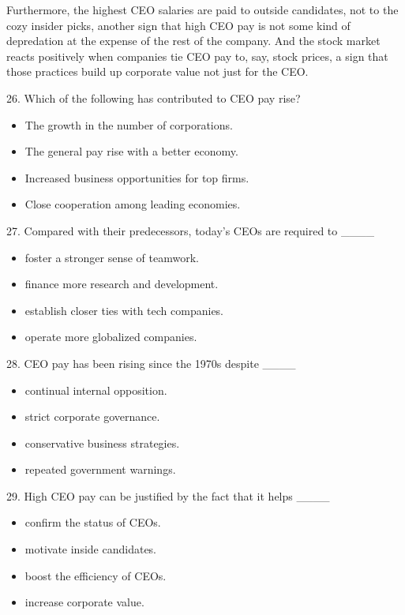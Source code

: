 \documentclass[UTF8,11pt]{ctexart}
\begin{document}
Furthermore, the highest CEO salaries are paid to outside candidates, not to the cozy insider picks, another sign that high CEO pay is not some kind of depredation at the expense of the rest of the company. And the stock market reacts positively when companies tie CEO pay to, say, stock prices, a sign that those practices build up corporate value not just for the CEO.


26. Which of the following has contributed to CEO pay rise?


\begin{itemize}[leftmargin=2em,itemsep=.2em,topsep=.4em]\item[A.] The growth in the number of corporations.
\item[B.] The general pay rise with a better economy.
\item[C.] Increased business opportunities for top firms.
\item[D.] Close cooperation among leading economies.
\end{itemize}

27. Compared with their predecessors, today’s CEOs are required to \_\_\_\_


\begin{itemize}[leftmargin=2em,itemsep=.2em,topsep=.4em]\item[A.] foster a stronger sense of teamwork.
\item[B.] finance more research and development.
\item[C.] establish closer ties with tech companies.
\item[D.] operate more globalized companies.
\end{itemize}

28. CEO pay has been rising since the 1970s despite \_\_\_\_


\begin{itemize}[leftmargin=2em,itemsep=.2em,topsep=.4em]\item[A.] continual internal opposition.
\item[B.] strict corporate governance.
\item[C.] conservative business strategies.
\item[D.] repeated government warnings.
\end{itemize}

29. High CEO pay can be justified by the fact that it helps \_\_\_\_


\begin{itemize}[leftmargin=2em,itemsep=.2em,topsep=.4em]\item[A.] confirm the status of CEOs.
\item[B.] motivate inside candidates.
\item[C.] boost the efficiency of CEOs.
\item[D.] increase corporate value.
\end{itemize}
\end{document}
